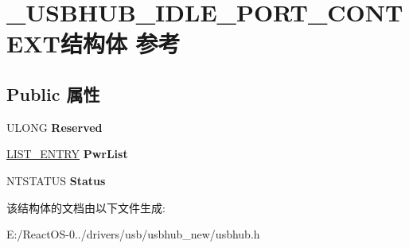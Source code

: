 \hypertarget{struct___u_s_b_h_u_b___i_d_l_e___p_o_r_t___c_o_n_t_e_x_t}{}\section{\+\_\+\+U\+S\+B\+H\+U\+B\+\_\+\+I\+D\+L\+E\+\_\+\+P\+O\+R\+T\+\_\+\+C\+O\+N\+T\+E\+X\+T结构体 参考}
\label{struct___u_s_b_h_u_b___i_d_l_e___p_o_r_t___c_o_n_t_e_x_t}
\subsection*{Public 属性}
\begin{DoxyCompactItemize}
\item 
\mbox{\label{struct___u_s_b_h_u_b___i_d_l_e___p_o_r_t___c_o_n_t_e_x_t_a2f132b39b334205080714d37b4ec771d}} 
U\+L\+O\+NG {\bfseries Reserved}
\item 
\mbox{\label{struct___u_s_b_h_u_b___i_d_l_e___p_o_r_t___c_o_n_t_e_x_t_a226da1d5ee67da707e682f7cc824d46c}} 
\hyperlink{struct___l_i_s_t___e_n_t_r_y}{L\+I\+S\+T\+\_\+\+E\+N\+T\+RY} {\bfseries Pwr\+List}
\item 
\mbox{\label{struct___u_s_b_h_u_b___i_d_l_e___p_o_r_t___c_o_n_t_e_x_t_a7b0f7ac69aef69e6a710b696487562f5}} 
N\+T\+S\+T\+A\+T\+US {\bfseries Status}
\end{DoxyCompactItemize}


该结构体的文档由以下文件生成\+:\begin{DoxyCompactItemize}
\item 
E\+:/\+React\+O\+S-\/0../drivers/usb/usbhub\+\_\+new/usbhub.\+h\end{DoxyCompactItemize}
